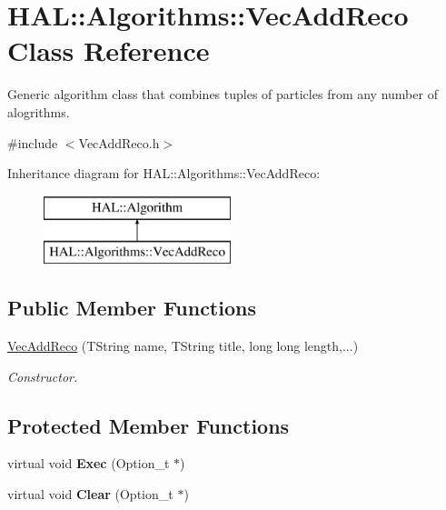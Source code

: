 \hypertarget{class_h_a_l_1_1_algorithms_1_1_vec_add_reco}{\section{H\+A\+L\+:\+:Algorithms\+:\+:Vec\+Add\+Reco Class Reference}
\label{class_h_a_l_1_1_algorithms_1_1_vec_add_reco}
}


Generic algorithm class that combines tuples of particles from any number of alogrithms.  




{\ttfamily \#include $<$Vec\+Add\+Reco.\+h$>$}

Inheritance diagram for H\+A\+L\+:\+:Algorithms\+:\+:Vec\+Add\+Reco\+:\begin{figure}[H]
\begin{center}
\leavevmode
\includegraphics[height=2.000000cm]{class_h_a_l_1_1_algorithms_1_1_vec_add_reco}
\end{center}
\end{figure}
\subsection*{Public Member Functions}
\begin{DoxyCompactItemize}
\item 
\hyperlink{class_h_a_l_1_1_algorithms_1_1_vec_add_reco_a50faa627aa37f90ac35eccb3f24fb851}{Vec\+Add\+Reco} (T\+String name, T\+String title, long long length,...)
\begin{DoxyCompactList}\small\item\em Constructor. \end{DoxyCompactList}\end{DoxyCompactItemize}
\subsection*{Protected Member Functions}
\begin{DoxyCompactItemize}
\item 
\hypertarget{class_h_a_l_1_1_algorithms_1_1_vec_add_reco_a63f7458fec37ae553418b15a375dafa0}{virtual void {\bfseries Exec} (Option\+\_\+t $\ast$)}\label{class_h_a_l_1_1_algorithms_1_1_vec_add_reco_a63f7458fec37ae553418b15a375dafa0}

\item 
\hypertarget{class_h_a_l_1_1_algorithms_1_1_vec_add_reco_afcf9f83e8165c1cbd7a193ab8f9c8445}{virtual void {\bfseries Clear} (Option\+\_\+t $\ast$)}\label{class_h_a_l_1_1_algorithms_1_1_vec_add_reco_afcf9f83e8165c1cbd7a193ab8f9c8445}

\end{DoxyCompactItemize}
